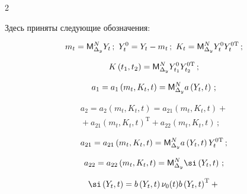 \begin{multicols}{2}
\begin{itemize}
    Здесь приняты следующие обозначения:

    $$

    m_t = {\sf M}_{\Delta_y}^N Y_t\,;\  Y_t^0 = Y_t - m_t\,;\  K_t = {\sf M}_{\Delta_y}^N Y_t^0 Y_t^{0\mathrm{T}}\,;

    $$

    $$

    K\left(t_1, t_2\right) = {\sf M}_{\Delta_y}^N Y_{t_1}^{0} Y_{t_2}^{0\mathrm{T}}\,;

    $$

    $$

    a_1 = a_1 \left(m_t, K_t, t\right) = {\sf M}_{\Delta_y}^N a \left(Y_t, t\right)\,;

    $$



    \vspace*{-12pt}



    \noindent

    \begin{multline*}

    a_2 = a_2 \left(m_t, K_t, t\right) = a_{21} \left(m_t, K_t, t\right)+ {}\\

    {}+a_{21} \left(m_t, K_t, t\right)^{\mathrm{T}} +a_{22}\left(m_t, K_t, t\right)\,;

    \end{multline*}



    \vspace*{-9pt}



    \noindent

    $$

    a_{21} = a_{21}\left(m_t, K_t, t\right)=  {\sf M}_{\Delta_y}^N a\left(Y_t, t\right) Y_{t}^{0\mathrm{T}}\,;

    $$

    $$

    a_{22} = a_{22}\left(m_t, K_t, t\right)= {\sf M}_{\Delta_y}^N \si \left(Y_t, t\right)\,;

    $$



    \vspace*{-12pt}



    \noindent

    \begin{multline*}

    \si \left(Y_t, t\right) = b\left(Y_t, t\right) \nu_0(t) b\left(Y_t, t\right)^{\mathrm{T}} +{}\\


\end{multline*}
\end{itemize}
\end{multicols}
